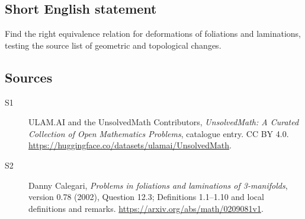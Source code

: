 \documentclass[11pt]{article}
\begin{document}
\subsection{Short English statement}
Find the right equivalence relation for deformations of foliations and laminations, testing the source list of geometric and topological changes.
\subsection{Sources}
\begin{description}
\item[\hypertarget{source:statement:1}{S1}] ULAM.AI and the UnsolvedMath Contributors, \emph{UnsolvedMath: A Curated Collection of Open Mathematics Problems}, catalogue entry. CC BY 4.0. \url{https://huggingface.co/datasets/ulamai/UnsolvedMath}.
\item[\hypertarget{source:statement:2}{S2}] Danny Calegari, \emph{Problems in foliations and laminations of 3-manifolds}, version 0.78 (2002), Question 12.3; Definitions 1.1--1.10 and local definitions and remarks. \url{https://arxiv.org/abs/math/0209081v1}.
\end{description}
\label{end:statement}
\end{document}
